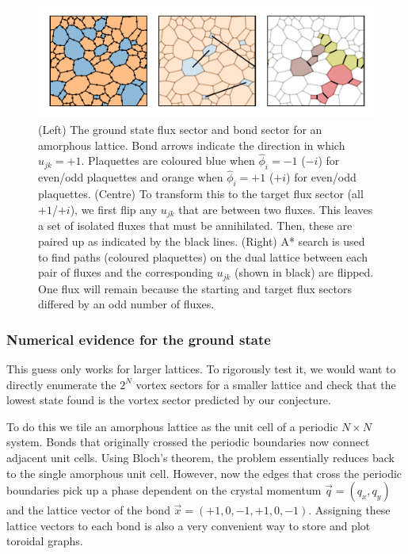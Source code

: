 \hypertarget{fig:flux_finding}{%
\begin{figure}
\centering
\includegraphics[width=1\textwidth,height=\textheight]{figure_code/amk_chapter/flux_finding/flux_finding}
\caption[{Finding Bond Sectors from Flux Sectors}]{(Left) The ground state flux sector and bond sector for an amorphous lattice. Bond arrows indicate the direction in which \(u_{jk} = +1\). Plaquettes are coloured blue when \(\hat{\phi}_i = -1\) (\(-i\)) for even/odd plaquettes and orange when \(\hat{\phi}_i = +1\) (\(+i\)) for even/odd plaquettes. (Centre) To transform this to the target flux sector (all \(+1\)/\(+i\)), we first flip any \(u_{jk}\) that are between two fluxes. This leaves a set of isolated fluxes that must be annihilated. Then, these are paired up as indicated by the black lines. (Right) A* search is used to find paths (coloured plaquettes) on the dual lattice between each pair of fluxes and the corresponding \(u_{jk}\) (shown in black) are flipped. One flux will remain because the starting and target flux sectors differed by an odd number of fluxes.}
\label{fig:flux_finding}
\end{figure}
}

\hypertarget{numerical-evidence-for-the-ground-state}{%
\subsubsection{Numerical evidence for the ground state}\label{numerical-evidence-for-the-ground-state}}

This guess only works for larger lattices. To rigorously test it, we would want to directly enumerate the \(2^N\) vortex sectors for a smaller lattice and check that the lowest state found is the vortex sector predicted by our conjecture.

To do this we tile an amorphous lattice as the unit cell of a periodic \(N\times N\) system. Bonds that originally crossed the periodic boundaries now connect adjacent unit cells. Using Bloch's theorem, the problem essentially reduces back to the single amorphous unit cell. However, now the edges that cross the periodic boundaries pick up a phase dependent on the crystal momentum \(\vec{q} = (q_x, q_y)\) and the lattice vector of the bond \(\vec{x} = (+1, 0, -1, +1, 0, -1)\). Assigning these lattice vectors to each bond is also a very convenient way to store and plot toroidal graphs.

